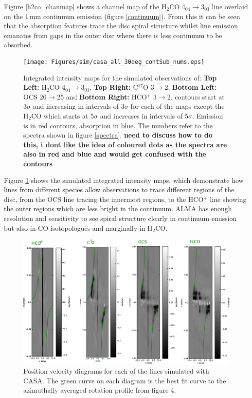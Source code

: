 \documentclass[useAMS,usenatbib]{mn2e}
\begin{document}
Figure \ref{h2co_chanmap} shows a channel map of the H$_2$CO 4$_{04}\rightarrow$3$_{03}$ line overlaid on the 1$\,$mm continuum emission (figure \ref{continuum}). From this it can be seen that the absorption features trace the disc spiral structure whilst line emission emanates from gaps in the outer disc where there is less continuum to be absorbed.\newline


\begin{figure}
 \texttt{[image: Figures/sim/casa\_all\_30deg\_contSub\_nums.eps]}
 \caption{Integrated intensity maps for the simulated observations of: {\bf Top Left:} H$_2$CO 4$_{04}\rightarrow$3$_{03}$, {\bf Top Right:} C$^{17}$O 3$\rightarrow$2, {\bf Bottom Left:} OCS 26$\rightarrow$25 and {\bf Bottom Right:} HCO$^+$ 3$\rightarrow$2. contours start at 3$\sigma$ and increasing in intervals of 3$\sigma$ for each of the maps except the H$_2$CO which starts at 5$\sigma$ and increases in intervals of 5$\sigma$. Emission is in red contours, absorption in blue. The numbers refer to the spectra shown in figure \ref{spectra}. {\bf need to discuss how to do this, i dont like the idea of coloured dots as the spectra are also in red and blue and would get confused with the contours}}
\label{mom0_maps}
\end{figure}

Figure \ref{mom0_maps} shows the simulated integrated intensity maps, which demonstrate how lines from different species allow observations to trace different regions of the disc, from the OCS line tracing the innermost regions, to the HCO$^+$ line showing the outer regions which are less bright in the continuum. ALMA has enough resolution and sensitivity to see spiral structure clearly in continuum emission but also in CO isotopologues and marginally in H$_2$CO.\newline


\begin{figure}
 \includegraphics[width=198mm]{Figures/sim/casa_all_30deg_PV_rotCurve_small.eps}
 \caption{Position velocity diagrams for each of the lines simulated with CASA. The green curve on each diagram is the best fit curve to the azimuthally averaged rotation profile from figure 4.}
 \label{pvs}
\end{figure}
\end{document}
